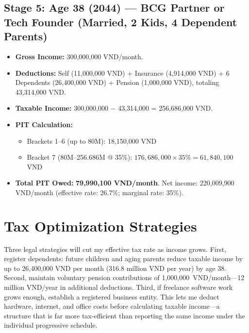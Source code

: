 \subsection{Stage 5: Age 38 (2044) --- BCG Partner or Tech Founder (Married, 2 Kids, 4 Dependent Parents)}
\begin{itemize}
  \item \textbf{Gross Income:} 300,000,000 VND/month.
  \item \textbf{Deductions:} Self (11,000,000 VND) + Insurance (4,914,000 VND) + 6 Dependents (26,400,000 VND) + Pension (1,000,000 VND), totaling 43,314,000 VND.
  \item \textbf{Taxable Income:} 300,000,000 $-$ 43,314,000 = 256,686,000 VND.
  \item \textbf{PIT Calculation:}
    \begin{itemize}
      \item Brackets 1--6 (up to 80M): 18,150,000 VND
      \item Bracket 7 (80M--256.686M @ 35\%): $176{,}686{,}000 \times 35\% = 61{,}840{,}100$ VND
    \end{itemize}
  \item \textbf{Total PIT Owed:} \textbf{79,990,100 VND/month}. Net income: 220,009,900 VND/month (effective rate: 26.7\%; marginal rate: 35\%).
\end{itemize}

\section{Tax Optimization Strategies}

Three legal strategies will cut my effective tax rate as income grows. First, register dependents: future children and aging parents reduce taxable income by up to 26,400,000 VND per month (316.8 million VND per year) by age 38. Second, maintain voluntary pension contributions of 1,000,000~VND/month---12 million VND/year in additional deductions. Third, if freelance software work grows enough, establish a registered business entity. This lets me deduct hardware, internet, and office costs before calculating taxable income---a structure that is far more tax-efficient than reporting the same income under the individual progressive schedule.

